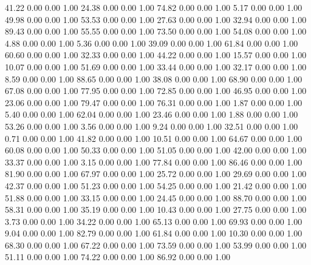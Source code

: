    41.22   0.00   0.00   1.00
   24.38   0.00   0.00   1.00
   74.82   0.00   0.00   1.00
    5.17   0.00   0.00   1.00
   49.98   0.00   0.00   1.00
   53.53   0.00   0.00   1.00
   27.63   0.00   0.00   1.00
   32.94   0.00   0.00   1.00
   89.43   0.00   0.00   1.00
   55.55   0.00   0.00   1.00
   73.50   0.00   0.00   1.00
   54.08   0.00   0.00   1.00
    4.88   0.00   0.00   1.00
    5.36   0.00   0.00   1.00
   39.09   0.00   0.00   1.00
   61.84   0.00   0.00   1.00
   60.60   0.00   0.00   1.00
   32.33   0.00   0.00   1.00
   44.22   0.00   0.00   1.00
   15.57   0.00   0.00   1.00
   10.07   0.00   0.00   1.00
   51.69   0.00   0.00   1.00
   33.44   0.00   0.00   1.00
   32.17   0.00   0.00   1.00
    8.59   0.00   0.00   1.00
   88.65   0.00   0.00   1.00
   38.08   0.00   0.00   1.00
   68.90   0.00   0.00   1.00
   67.08   0.00   0.00   1.00
   77.95   0.00   0.00   1.00
   72.85   0.00   0.00   1.00
   46.95   0.00   0.00   1.00
   23.06   0.00   0.00   1.00
   79.47   0.00   0.00   1.00
   76.31   0.00   0.00   1.00
    1.87   0.00   0.00   1.00
    5.40   0.00   0.00   1.00
   62.04   0.00   0.00   1.00
   23.46   0.00   0.00   1.00
    1.88   0.00   0.00   1.00
   53.26   0.00   0.00   1.00
    3.56   0.00   0.00   1.00
    9.24   0.00   0.00   1.00
   32.51   0.00   0.00   1.00
    0.71   0.00   0.00   1.00
   41.82   0.00   0.00   1.00
   10.51   0.00   0.00   1.00
   64.67   0.00   0.00   1.00
   60.08   0.00   0.00   1.00
   50.33   0.00   0.00   1.00
   51.05   0.00   0.00   1.00
   42.00   0.00   0.00   1.00
   33.37   0.00   0.00   1.00
    3.15   0.00   0.00   1.00
   77.84   0.00   0.00   1.00
   86.46   0.00   0.00   1.00
   81.90   0.00   0.00   1.00
   67.97   0.00   0.00   1.00
   25.72   0.00   0.00   1.00
   29.69   0.00   0.00   1.00
   42.37   0.00   0.00   1.00
   51.23   0.00   0.00   1.00
   54.25   0.00   0.00   1.00
   21.42   0.00   0.00   1.00
   51.88   0.00   0.00   1.00
   33.15   0.00   0.00   1.00
   24.45   0.00   0.00   1.00
   88.70   0.00   0.00   1.00
   58.31   0.00   0.00   1.00
   35.19   0.00   0.00   1.00
   10.43   0.00   0.00   1.00
   27.75   0.00   0.00   1.00
    3.73   0.00   0.00   1.00
   34.22   0.00   0.00   1.00
   65.13   0.00   0.00   1.00
   69.93   0.00   0.00   1.00
    9.04   0.00   0.00   1.00
   82.79   0.00   0.00   1.00
   61.84   0.00   0.00   1.00
   10.30   0.00   0.00   1.00
   68.30   0.00   0.00   1.00
   67.22   0.00   0.00   1.00
   73.59   0.00   0.00   1.00
   53.99   0.00   0.00   1.00
   51.11   0.00   0.00   1.00
   74.22   0.00   0.00   1.00
   86.92   0.00   0.00   1.00
